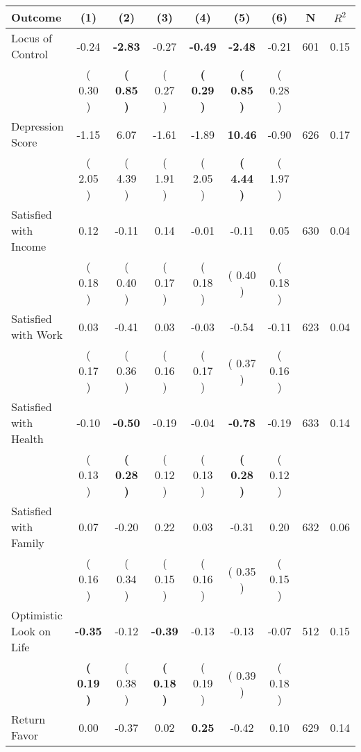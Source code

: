 \begin{tabular}{lcccccccc}
\toprule
 \textbf{Outcome} & \textbf{(1)} & \textbf{(2)} & \textbf{(3)} & \textbf{(4)} & \textbf{(5)} & \textbf{(6)} & \textbf{N} & \textbf{$ R^2$} \\
\midrule
Locus of Control &     -0.24 & \textbf{    -2.83} &     -0.27 & \textbf{    -0.49} & \textbf{    -2.48} &     -0.21 & 601 &       0.15 \\ 
 & (     0.30 ) & \textbf{(     0.85 )} & (     0.27 ) & \textbf{(     0.29 )} & \textbf{(     0.85 )} & (     0.28 ) & \\
Depression Score &     -1.15 &      6.07 &     -1.61 &     -1.89 & \textbf{    10.46} &     -0.90 & 626 &       0.17 \\ 
 & (     2.05 ) & (     4.39 ) & (     1.91 ) & (     2.05 ) & \textbf{(     4.44 )} & (     1.97 ) & \\
Satisfied with Income &      0.12 &     -0.11 &      0.14 &     -0.01 &     -0.11 &      0.05 & 630 &       0.04 \\ 
 & (     0.18 ) & (     0.40 ) & (     0.17 ) & (     0.18 ) & (     0.40 ) & (     0.18 ) & \\
Satisfied with Work &      0.03 &     -0.41 &      0.03 &     -0.03 &     -0.54 &     -0.11 & 623 &       0.04 \\ 
 & (     0.17 ) & (     0.36 ) & (     0.16 ) & (     0.17 ) & (     0.37 ) & (     0.16 ) & \\
Satisfied with Health &     -0.10 & \textbf{    -0.50} &     -0.19 &     -0.04 & \textbf{    -0.78} &     -0.19 & 633 &       0.14 \\ 
 & (     0.13 ) & \textbf{(     0.28 )} & (     0.12 ) & (     0.13 ) & \textbf{(     0.28 )} & (     0.12 ) & \\
Satisfied with Family &      0.07 &     -0.20 &      0.22 &      0.03 &     -0.31 &      0.20 & 632 &       0.06 \\ 
 & (     0.16 ) & (     0.34 ) & (     0.15 ) & (     0.16 ) & (     0.35 ) & (     0.15 ) & \\
Optimistic Look on Life & \textbf{    -0.35} &     -0.12 & \textbf{    -0.39} &     -0.13 &     -0.13 &     -0.07 & 512 &       0.15 \\ 
 & \textbf{(     0.19 )} & (     0.38 ) & \textbf{(     0.18 )} & (     0.19 ) & (     0.39 ) & (     0.18 ) & \\
Return Favor &      0.00 &     -0.37 &      0.02 & \textbf{     0.25} &     -0.42 &      0.10 & 629 &       0.14 \\ 

\end{tabular}
